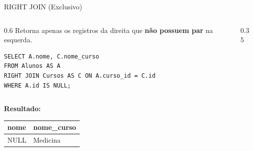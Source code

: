 \documentclass[10pt]{beamer}
\begin{document}
\begin{frame}[fragile]{RIGHT JOIN (Exclusivo)}
    \begin{columns}
        \begin{column}{0.6\textwidth}
            Retorna apenas os registros da direita que \textbf{não possuem par} na esquerda.
            \begin{lstlisting}
SELECT A.nome, C.nome_curso
FROM Alunos AS A
RIGHT JOIN Cursos AS C ON A.curso_id = C.id
WHERE A.id IS NULL;
            \end{lstlisting}
        \end{column}
        \begin{column}{0.35\textwidth}
            \centering
        \end{column}
    \end{columns}
    \textbf{Resultado:}
    \small
    \begin{table}
        \begin{tabular}{ll}
        \toprule
        \textbf{nome} & \textbf{nome\_curso} \\ \midrule
        \alert{NULL} & \alert{Medicina} \\ \bottomrule
        \end{tabular}
    \end{table}
\end{frame}
\end{document}
